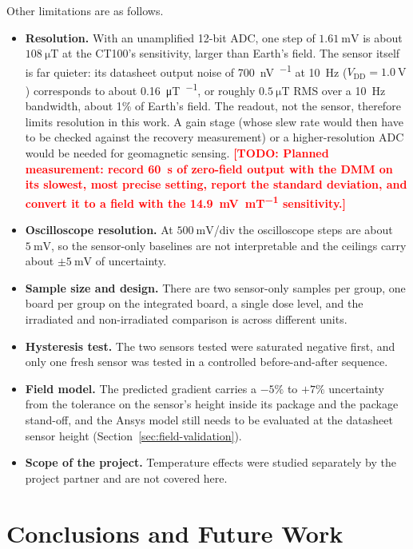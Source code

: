 \documentclass[12pt,a4paper]{article}
\newcommand{\todo}[1]{\textcolor{red}{\textbf{[TODO: #1]}}}
\begin{document}
Other limitations are as follows.
\begin{itemize}
\item \textbf{Resolution.} With an unamplified 12-bit ADC, one step of $\SI{1.61}{\milli\volt}$ is about $\SI{108}{\micro\tesla}$ at the CT100's sensitivity, larger than Earth's field. The sensor itself is far quieter: its datasheet output noise of \SI{700}{\nano\volt\per\sqrt{\hertz}} at \SI{10}{\hertz} ($V_{\text{DD}} = \SI{1.0}{\volt}$) \cite{ct100_datasheet} corresponds to about \SI{0.16}{\micro\tesla\per\sqrt{\hertz}}, or roughly $\SI{0.5}{\micro\tesla}$ RMS over a \SI{10}{\hertz} bandwidth, about 1\% of Earth's field. The readout, not the sensor, therefore limits resolution in this work. A gain stage (whose slew rate would then have to be checked against the recovery measurement) or a higher-resolution ADC would be needed for geomagnetic sensing. \todo{Planned measurement: record \SI{60}{\second} of zero-field output with the DMM on its slowest, most precise setting, report the standard deviation, and convert it to a field with the \SI{14.9}{\milli\volt\per\milli\tesla} sensitivity.}
\item \textbf{Oscilloscope resolution.} At $\SI{500}{\milli\volt}$/div the oscilloscope steps are about $\SI{5}{\milli\volt}$, so the sensor-only baselines are not interpretable and the ceilings carry about $\pm\SI{5}{\milli\volt}$ of uncertainty.
\item \textbf{Sample size and design.} There are two sensor-only samples per group, one board per group on the integrated board, a single dose level, and the irradiated and non-irradiated comparison is across different units.
\item \textbf{Hysteresis test.} The two sensors tested were saturated negative first, and only one fresh sensor was tested in a controlled before-and-after sequence.
\item \textbf{Field model.} The predicted gradient carries a $-5\%$ to $+7\%$ uncertainty from the tolerance on the sensor's height inside its package and the package stand-off, and the Ansys model still needs to be evaluated at the datasheet sensor height (Section~\ref{sec:field-validation}).
\item \textbf{Scope of the project.} Temperature effects were studied separately by the project partner and are not covered here.
\end{itemize}




\section{Conclusions and Future Work}
\label{sec:conclusions}
\end{document}
